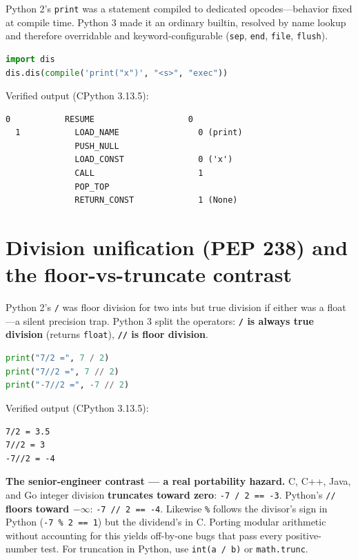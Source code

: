 Python 2's \texttt{print} was a statement compiled to dedicated opcodes---behavior fixed at
compile time. Python 3 made it an ordinary builtin, resolved by name lookup and therefore
overridable and keyword-configurable (\texttt{sep}, \texttt{end}, \texttt{file}, \texttt{flush}).

\begin{lstlisting}[language=Python, caption={print is a function call --- note the modern CALL opcode.}]
import dis
dis.dis(compile('print("x")', "<s>", "exec"))
\end{lstlisting}

Verified output (CPython 3.13.5):

\begin{lstlisting}[caption={Output}]
  0           RESUME                   0
  1           LOAD_NAME                0 (print)
              PUSH_NULL
              LOAD_CONST               0 ('x')
              CALL                     1
              POP_TOP
              RETURN_CONST             1 (None)
\end{lstlisting}

\section{Division unification (PEP 238) and the floor-vs-truncate contrast}

Python 2's \texttt{/} was floor division for two ints but true division if either was a
float---a silent precision trap. Python 3 split the operators: \textbf{\texttt{/} is always true
division} (returns \texttt{float}), \textbf{\texttt{//} is floor division}.

\begin{lstlisting}[language=Python, caption={/ is true division; // floors toward negative infinity.}]
print("7/2 =", 7 / 2)
print("7//2 =", 7 // 2)
print("-7//2 =", -7 // 2)
\end{lstlisting}

Verified output (CPython 3.13.5):

\begin{lstlisting}[caption={Output}]
7/2 = 3.5
7//2 = 3
-7//2 = -4
\end{lstlisting}

\textbf{The senior-engineer contrast --- a real portability hazard.} C, C++, Java, and Go integer
division \textbf{truncates toward zero}: \texttt{-7 / 2 == -3}. Python's \texttt{//} \textbf{floors
toward $-\infty$}: \texttt{-7 // 2 == -4}. Likewise \texttt{\%} follows the divisor's sign in
Python (\texttt{-7 \% 2 == 1}) but the dividend's in C. Porting modular arithmetic without
accounting for this yields off-by-one bugs that pass every positive-number test. For truncation
in Python, use \texttt{int(a / b)} or \texttt{math.trunc}.

